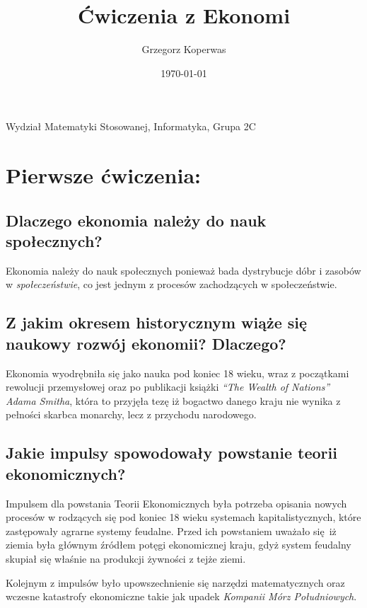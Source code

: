 \documentclass[a4paper,12pt]{article}
\title{Ćwiczenia z Ekonomi}
\author{Grzegorz Koperwas}
\date{\today}
\begin{document}
\begin{titlepage}
	\maketitle
	\begin{center}
		Wydział Matematyki Stosowanej, Informatyka, Grupa 2C
	\end{center}
	\thispagestyle{empty}
\end{titlepage}

\section{Pierwsze ćwiczenia:}


\subsection{Dlaczego ekonomia należy do nauk społecznych?}

Ekonomia należy do nauk społecznych ponieważ bada dystrybucje dóbr i zasobów w
\emph{społeczeństwie}, co jest jednym z procesów zachodzących w społeczeństwie.

\subsection{Z jakim okresem historycznym wiąże się naukowy rozwój ekonomii? Dlaczego?}

Ekonomia wyodrębniła się jako nauka pod koniec 18 wieku, wraz z początkami rewolucji
przemysłowej oraz po publikacji książki \emph{“The Wealth of Nations” Adama Smitha},
która to przyjęła tezę iż bogactwo danego kraju nie wynika z pełności skarbca monarchy,
lecz z przychodu narodowego.

\subsection{Jakie impulsy spowodowały powstanie teorii ekonomicznych?}

Impulsem dla powstania Teorii Ekonomicznych była potrzeba opisania nowych procesów w rodzących się pod koniec 18 wieku systemach kapitalistycznych, które zastępowały agrarne systemy feudalne. Przed ich powstaniem uważało się iż ziemia była głównym źródłem potęgi ekonomicznej kraju, gdyż system feudalny skupiał się właśnie na produkcji żywności z tejże ziemi.

Kolejnym z impulsów było upowszechnienie się narzędzi matematycznych oraz wczesne katastrofy ekonomiczne takie jak upadek \emph{Kompanii Mórz Południowych}.
\end{document}
